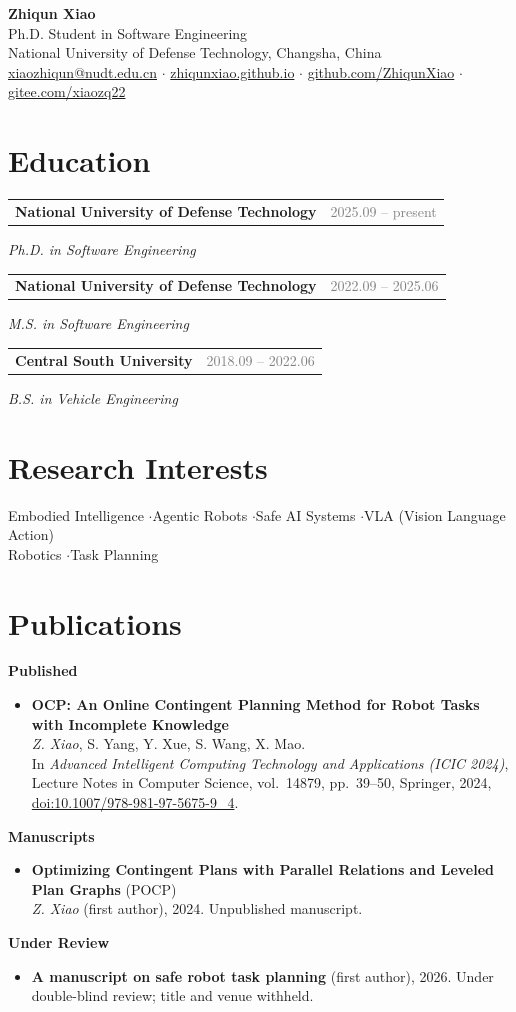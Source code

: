 \documentclass[10pt]{article}
\makeatletter
\newcommand{\entry}[3]{%
  \noindent\begin{tabular*}{\textwidth}{@{}l@{\extracolsep{\fill}}r@{}}
    \textbf{#1} & \textcolor{graytext}{#2}
  \end{tabular*}\par\vspace{-0.25em}
  \noindent\textit{#3}\par\vspace{0.22em}
}
\makeatother
\begin{document}
\linespread{1.02}\selectfont

{\Huge\bfseries Zhiqun Xiao}\\[0.35em]
{\color{graytext} Ph.D. Student in Software Engineering}\\[0.5em]
National University of Defense Technology, Changsha, China\\
\href{mailto:xiaozhiqun@nudt.edu.cn}{xiaozhiqun@nudt.edu.cn} \quad$\cdot$\quad
\href{https://zhiqunxiao.github.io}{zhiqunxiao.github.io} \quad$\cdot$\quad
\href{https://github.com/ZhiqunXiao}{github.com/ZhiqunXiao} \quad$\cdot$\quad
\href{https://gitee.com/xiaozq22}{gitee.com/xiaozq22}

\section{Education}
\entry{National University of Defense Technology}{2025.09 -- present}{Ph.D. in Software Engineering}
\entry{National University of Defense Technology}{2022.09 -- 2025.06}{M.S. in Software Engineering}
\entry{Central South University}{2018.09 -- 2022.06}{B.S. in Vehicle Engineering}

\section{Research Interests}
Embodied Intelligence \quad$\cdot$\quad Agentic Robots \quad$\cdot$\quad Safe AI Systems \quad$\cdot$\quad VLA (Vision Language Action) \\[0.3em]
Robotics \quad$\cdot$\quad Task Planning

\section{Publications}
\noindent\textbf{Published}
\begin{itemize}
\item \textbf{OCP: An Online Contingent Planning Method for Robot Tasks with Incomplete Knowledge}\\
  \textit{Z. Xiao}, S. Yang, Y. Xue, S. Wang, X. Mao.\\
  In \textit{Advanced Intelligent Computing Technology and Applications (ICIC 2024)}, Lecture Notes in Computer Science, vol.~14879, pp.~39--50, Springer, 2024, \href{https://doi.org/10.1007/978-981-97-5675-9_4}{doi:10.1007/978-981-97-5675-9\_4}.
\end{itemize}
\vspace{0.2em}
\noindent\textbf{Manuscripts}
\begin{itemize}
\item \textbf{Optimizing Contingent Plans with Parallel Relations and Leveled Plan Graphs} (POCP)\\
  \textit{Z. Xiao} (first author), 2024. Unpublished manuscript.
\end{itemize}
\vspace{0.2em}
\noindent\textbf{Under Review}
\begin{itemize}
\item \textbf{A manuscript on safe robot task planning} (first author), 2026. Under double-blind review; title and venue withheld.
\end{itemize}
\end{document}
